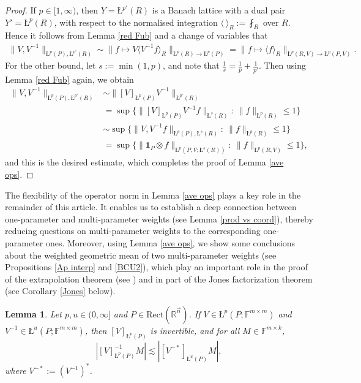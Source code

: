 \documentclass[11pt, reqno]{amsart}
\newtheorem{lemma}[theorem]{Lemma}
\theoremstyle{definition}
\theoremstyle{remark}
\numberwithin{equation}{section}
\newcommand{\F}{\mathbb F}
\newcommand{\R}{\mathbb R}
\newcommand{\vn}{\vec n}
\newcommand{\one}{\mathbf{1}}
\newcommand{\ave}[1]{\langle #1\rangle}
\newcommand{\aveL}{\textit{\L}}
\newcommand{\abs}[1]{|#1|}
\newcommand{\Norm}[2]{\|#1\|_{#2}}
\newcommand{\Rect}{\mathrm{Rect}}
\begin{document}
\begin{proof}
If $p\in[1,\infty)$, then $Y=\aveL^{p'}(R)$ is a Banach lattice with a dual pair $Y'=\aveL^p(R)$, with respect to the normalised integration $\ave{\ }_R:=\fint_R$ over $R$.
Hence it follows from Lemma \ref{red Fub} and a change of variables that
\begin{align*}
\Norm{V,V^{-1}}{\aveL^p(P),\aveL^{p'}(R)}
\sim \Norm{f\mapsto V\ave{V^{-1}f}_R}{\aveL^{p}(R)\to\aveL^p(P)}
=\Norm{f\mapsto \ave{f}_R}{\aveL^{p}(R,V)\to\aveL^p(P,V)}.
\end{align*}
For the other bound, let $s:=\min(1,p)$,
and note that $\frac 1s=\frac 1p+\frac 1{p'}$.
Then using Lemma \ref{red Fub} again, we obtain
\begin{align*}
\Norm{V,V^{-1}}{\aveL^p(P),\aveL^{p'}(R)}
&\sim\Norm{[V]_{\aveL^p(P)}V^{-1}}{\aveL^{p'}(R)} \\
&=\sup\Big\{\Norm{[V]_{\aveL^p(P)}V^{-1} f}{\aveL^{s}(R)}:\
\Norm{f}{\aveL^p(R)}\leq 1\Big\} \\
&\sim\sup\Big\{\Norm{V,V^{-1} f}{\aveL^p(P),\aveL^{s}(R)}:\
\Norm{f}{\aveL^p(R)}\leq 1\Big\} \\
&=\sup\Big\{\Norm{\one_P\otimes f}{\aveL^p(P,V;\aveL^s(R))}:\
\Norm{f}{\aveL^p(R,V)}\leq 1\Big\},
\end{align*}
and this is the desired estimate,
which completes the proof of Lemma \ref{ave ops}.
\end{proof}

The flexibility of the operator norm in Lemma \ref{ave ops}
plays a key role in the remainder of this article.
It enables us to establish a deep connection between
one-parameter and multi-parameter weights (see Lemma \ref{prod vs coord}),
thereby reducing questions on multi-parameter weights to the
corresponding one-parameter ones.
Moreover, using Lemma \ref{ave ops}, we show some conclusions about
the weighted geometric mean of two multi-parameter weights
(see Propositions \ref{Ap interp} and \ref{BCU2}),
which play an important role in the proof of
the extrapolation theorem (see \cite[p.\,49]{BCU})
and in part of the Jones factorization theorem (see Corollary \ref{Jones} below).


\begin{lemma}\label{inverses}
Let $p,u\in(0,\infty]$ and $P\in\Rect(\R^{\vn})$.
If $V\in\aveL^{p}(P;\F^{m\times m})$ and $V^{-1}\in\aveL^{u}(P;\F^{m\times m})$, then $[V]_{\aveL^{p}(P)}$ is invertible, and for all $M\in\F^{m\times k}$,
\begin{equation*}
\abs{[V]_{\aveL^{p}(P)}^{-1}M}\lesssim\abs{[V^{-*}]_{\aveL^{u}(P)}M},
\end{equation*}
where $V^{-*}:=(V^{-1})^*$.
\end{lemma}
\end{document}
